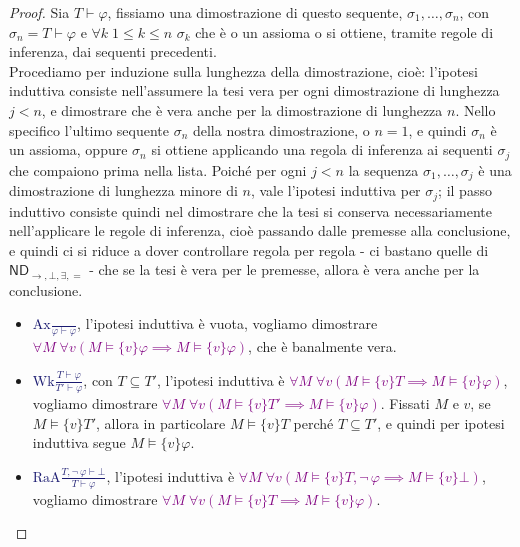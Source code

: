 \begin{proof}
    Sia $T \vdash \varphi$, fissiamo una dimostrazione di questo sequente, $\sigma_1,\ldots,\sigma_n$, con $\sigma_n = T \vdash \varphi$ e $\forall k \; 1 \leq k \leq n$ $\sigma_k$ che è o un assioma o si ottiene, tramite regole di inferenza, dai sequenti precedenti.\\
    Procediamo per induzione sulla lunghezza della dimostrazione, cioè: l'ipotesi induttiva consiste nell'assumere la tesi vera per ogni dimostrazione di lunghezza $j < n$, e dimostrare che è vera anche per la dimostrazione di lunghezza $n$.
    Nello specifico l'ultimo sequente $\sigma_n$ della nostra dimostrazione, o $n = 1$, e quindi $\sigma_n$ è un assioma, oppure $\sigma_n$ si ottiene applicando una regola di inferenza ai sequenti $\sigma_j$ che compaiono prima nella lista.
    Poiché per ogni $j < n$ la sequenza $\sigma_1, \ldots, \sigma_j$ è una dimostrazione di lunghezza minore di $n$, vale l'ipotesi induttiva per $\sigma_j$; il passo induttivo consiste quindi nel dimostrare 
    che la tesi si conserva necessariamente nell'applicare le regole di inferenza, cioè passando dalle premesse alla conclusione, e quindi ci si riduce a dover controllare regola per regola - ci bastano quelle di $\mathsf{ND}_{\to, \bot, \exists, =}$ - che se la tesi è vera per le premesse, allora è vera anche per la conclusione.
    \begin{itemize}
        \item \textcolor{MidnightBlue}{$\displaystyle\text{Ax} \frac{}{\varphi \vdash \varphi}$}, l'ipotesi induttiva è vuota, vogliamo dimostrare \textcolor{purple}{$\forall M \; \forall v (M \models \{v\}\varphi \implies M \models \{v\}\varphi)$}, che è banalmente vera.
        \item \textcolor{MidnightBlue}{$\displaystyle\text{Wk} \frac{T \vdash \varphi}{T' \vdash \varphi}$}, con $T \subseteq T'$, l'ipotesi induttiva è \textcolor{purple}{$\forall M \; \forall v (M \models \{v\}T \implies M \models \{v\}\varphi)$}, vogliamo dimostrare \textcolor{purple}{$\forall M \; \forall v (M \models \{v\}T' \implies M \models \{v\}\varphi)$}. Fissati $M$ e $v$, se $M \models \{v\}T'$, allora in particolare $M \models \{v\}T$ perché $T \subseteq T'$, e quindi per ipotesi induttiva segue $M \models \{v\}\varphi$.
        \item \textcolor{MidnightBlue}{$\displaystyle\text{RaA} \frac{T, \neg \,\varphi \vdash \bot}{T \vdash \varphi}$}, l'ipotesi induttiva è \textcolor{purple}{$\forall M \; \forall v (M \models \{v\}T,\neg \,\varphi \implies M \models \{v\}\bot)$}, vogliamo dimostrare \textcolor{purple}{$\forall M \; \forall v (M \models \{v\}T \implies M \models \{v\}\varphi)$}.

\end{itemize}
\end{proof}
